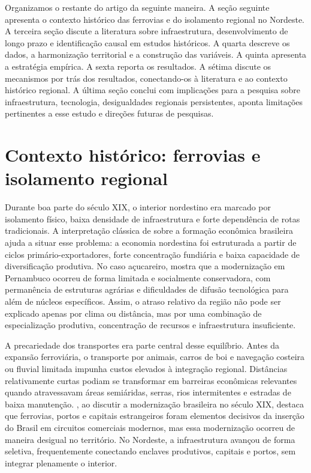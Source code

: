 \documentclass[12pt,a4paper]{article}
\begin{document}
Organizamos o restante do artigo da seguinte maneira. A seção seguinte apresenta o contexto histórico das ferrovias e do isolamento regional no Nordeste. A terceira seção discute a literatura sobre infraestrutura, desenvolvimento de longo prazo e identificação causal em estudos históricos. A quarta descreve os dados, a harmonização territorial e a construção das variáveis. A quinta apresenta a estratégia empírica. A sexta reporta os resultados. A sétima discute os mecanismos por trás dos resultados, conectando-os à literatura e ao contexto histórico regional. A última seção conclui com implicações para a pesquisa sobre infraestrutura, tecnologia, desigualdades regionais persistentes, aponta limitações pertinentes a esse estudo e direções futuras de pesquisas.

\section{Contexto histórico: ferrovias e isolamento regional}

Durante boa parte do século XIX, o interior nordestino era marcado por isolamento físico, baixa densidade de infraestrutura e forte dependência de rotas tradicionais. A interpretação clássica de \citet{furtado1959} sobre a formação econômica brasileira ajuda a situar esse problema: a economia nordestina foi estruturada a partir de ciclos primário-exportadores, forte concentração fundiária e baixa capacidade de diversificação produtiva. No caso açucareiro, \citet{eisenberg1974} mostra que a modernização em Pernambuco ocorreu de forma limitada e socialmente conservadora, com permanência de estruturas agrárias e dificuldades de difusão tecnológica para além de núcleos específicos. Assim, o atraso relativo da região não pode ser explicado apenas por clima ou distância, mas por uma combinação de especialização produtiva, concentração de recursos e infraestrutura insuficiente.

A precariedade dos transportes era parte central desse equilíbrio. Antes da expansão ferroviária, o transporte por animais, carros de boi e navegação costeira ou fluvial limitada impunha custos elevados à integração regional. Distâncias relativamente curtas podiam se transformar em barreiras econômicas relevantes quando atravessavam áreas semiáridas, serras, rios intermitentes e estradas de baixa manutenção. \citet{graham1968}, ao discutir a modernização brasileira no século XIX, destaca que ferrovias, portos e capitais estrangeiros foram elementos decisivos da inserção do Brasil em circuitos comerciais modernos, mas essa modernização ocorreu de maneira desigual no território. No Nordeste, a infraestrutura avançou de forma seletiva, frequentemente conectando enclaves produtivos, capitais e portos, sem integrar plenamente o interior.
\end{document}
